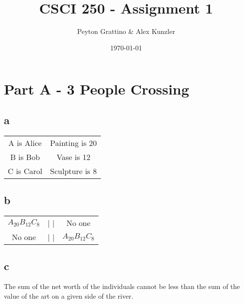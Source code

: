 \documentclass[12pt]{amsart}
\title{CSCI 250 - Assignment 1}
\author{Peyton Grattino \& Alex Kunzler}
\date{\today} %
\begin{document}
\maketitle
\tableofcontents


\pagebreak
\setcounter{secnumdepth}{1}
\section*{Part A - 3 People Crossing}

\subsection*{a}
\begin{tabular}{ c c }
A is Alice & Painting is 20 \\
B is Bob & Vase is 12 \\
C is Carol & Sculpture is 8

\end{tabular}
\subsection*{b}
\begin{tabular}{ c c c }

$A_{20} B_{12} C_{8}$ & | | & No one \\
No one & | | & $A_{20} B_{12} C_{8}$

\end{tabular}

\subsection*{c}
The sum of the net worth of the individuals cannot be less than the sum of the value of the art on a given side of the river.
\end{document}
